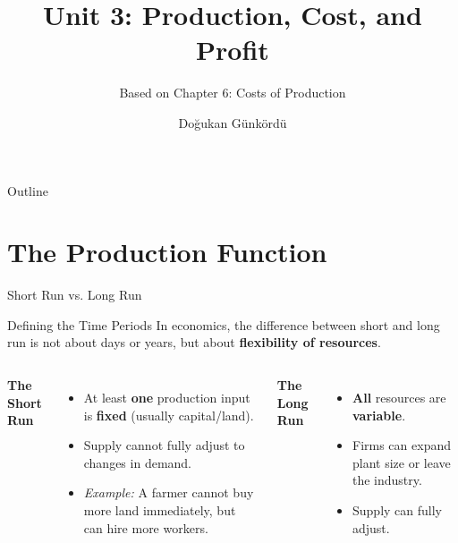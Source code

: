 \documentclass[aspectratio=169]{beamer}
\title{Unit 3: Production, Cost, and Profit}
\subtitle{Based on Chapter 6: Costs of Production}
\author{Doğukan Günkördü}
\date{}
\begin{document}
\begin{frame}
    \titlepage
\end{frame}

\begin{frame}{Outline}
    \tableofcontents
\end{frame}

\section{The Production Function}

\begin{frame}{Short Run vs. Long Run}
    \begin{block}{Defining the Time Periods}
        In economics, the difference between short and long run is not about days or years, but about \textbf{flexibility of resources}.
    \end{block}
    
    \vspace{0.5cm}
    
    \begin{columns}
        \textbf{The Short Run}
        \begin{itemize}
            \item At least \textbf{one} production input is \textbf{fixed} (usually capital/land).
            \item Supply cannot fully adjust to changes in demand.
            \item \textit{Example:} A farmer cannot buy more land immediately, but can hire more workers.
        \end{itemize}
        
        \textbf{The Long Run}
        \begin{itemize}
            \item \textbf{All} resources are \textbf{variable}.
            \item Firms can expand plant size or leave the industry.
            \item Supply can fully adjust.
        \end{itemize}
    \end{columns}
\end{frame}
\end{document}
